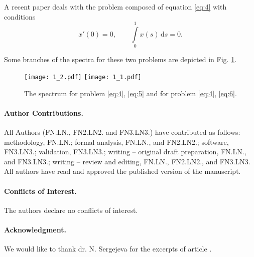 \documentclass[a4paper, 10pt]{article}
\begin{document}
A recent paper \cite{sergejevaLUMII} deals with the problem composed of equation \eqref{eq:4} with conditions
%
\begin{equation} \label{eq:6}
x'(0)=0, \qquad \int\limits_0^1x(s)\,\mathrm{d}s=0.
\end{equation}

Some branches of the spectra for these two problems are depicted in Fig. \ref{fig:1}.

\begin{figure}[ht]
\centering
\texttt{[image: 1\_2.pdf]}\quad
\texttt{[image: 1\_1.pdf]}
\caption{The spectrum for problem \eqref{eq:4}, \eqref{eq:5} and for problem \eqref{eq:4}, \eqref{eq:6}.}\label{fig:1}
\end{figure}
%
\paragraph{Author Contributions.} All Authors (FN.LN., FN2.LN2. and FN3.LN3.) have contributed as follows: methodology,
FN.LN.; formal analysis, FN.LN., and FN2.LN2.; software, FN3.LN3.; validation, FN3.LN3.; writing – original draft preparation, FN.LN., and FN3.LN3.; writing – review and editing, FN.LN., FN2.LN2., and FN3.LN3. All authors have read and approved the published version of the manuscript.



\paragraph{Conflicts of Interest.} The authors declare no conflicts of interest.

\paragraph{Acknowledgment.}
We would like to thank dr. N. Sergejeva for the excerpts of article \cite{2014SergejevaN}.



\end{document}
